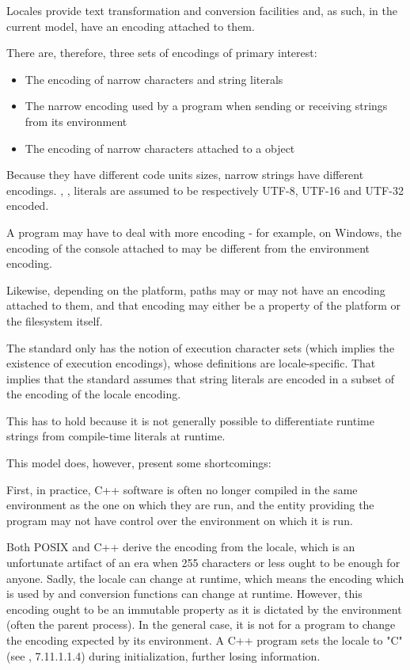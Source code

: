 \documentclass{wg21}
\begin{document}
Locales provide text transformation and conversion facilities and, as such, in the current model, have an encoding attached to them.

There are, therefore, three sets of encodings of primary interest:

\begin{itemize}
    \item The encoding of narrow characters and string literals
    \item The narrow encoding used by a program when sending or receiving strings from its environment
    \item The encoding of narrow characters attached to a  object
\end{itemize}

\note Because they have different code units sizes, narrow strings have different encodings.
, ,  literals are assumed to be respectively UTF-8, UTF-16 and UTF-32 encoded.
\endnote

\note A program may have to deal with more encoding - for example, on Windows, the encoding of the console attached to  may be different from the environment encoding.

Likewise, depending on the platform, paths may or may not have an encoding attached to them, and that encoding may either be a property of the platform or the filesystem itself.
\endnote


The standard only has the notion of execution character sets (which implies the existence of execution encodings), whose definitions are locale-specific.
That implies that the standard assumes that string literals are encoded in a subset of the encoding of the locale encoding.

This has to hold because it is not generally possible to differentiate runtime strings from compile-time literals at runtime.

This model does, however, present some shortcomings:

First, in practice, C++ software is often no longer compiled in the same environment as the one on which they are run, and the entity providing the program may not have control over the environment on which it is run.

Both POSIX and C++ derive the encoding from the locale, which is an unfortunate artifact of an era when 255 characters or less ought to be enough for anyone.
Sadly, the locale can change at runtime, which means the encoding which is used by  and conversion functions can change at runtime.
However, this encoding ought to be an immutable property as it is dictated by the environment (often the parent process).
In the general case, it is not for a program to change the encoding expected by its environment.
A C++ program sets the locale to "C" (see \cite{N2346}, 7.11.1.1.4) during initialization, further losing information.
\end{document}

